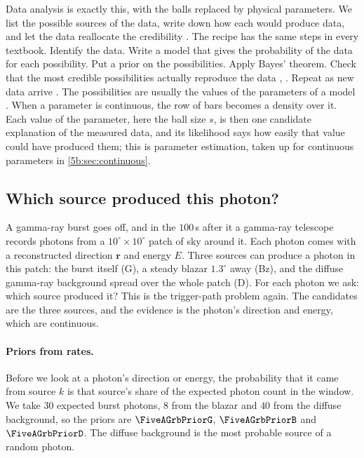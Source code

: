 Data analysis is exactly this, with the balls replaced by physical parameters. We
list the possible sources of the data, write down how each would produce data,
and let the data reallocate the credibility . The recipe
has the same steps in every textbook. Identify the data. Write a model that gives
the probability of the data for each possibility. Put a prior on the
possibilities. Apply Bayes' theorem. Check that the most credible possibilities
actually reproduce the data , . Repeat as
new data arrive . The possibilities are usually the
values of the parameters of a model . When a parameter is
continuous, the row of bars becomes a density over it. Each value of the parameter, here
the ball size $s$, is then one candidate explanation of the measured data, and
its likelihood says how easily that value could have produced them; this is
parameter estimation, taken up for continuous parameters in
\cref{5b:sec:continuous}.

\subsection{Which source produced this photon?}

A gamma-ray burst goes off, and in the $100\,$s after it a gamma-ray telescope
records photons from a $10^\circ\times10^\circ$ patch of sky around it. Each photon
comes with a reconstructed direction $\bm r$ and energy $E$. Three sources can produce
a photon in this patch: the burst itself (G), a steady blazar $1.3^\circ$ away (Bz),
and the diffuse gamma-ray background spread over the whole patch (D). For each
photon we ask: which source produced it? This is the trigger-path problem again.
The candidates are the three sources, and the evidence is the photon's direction
and energy, which are continuous.

\paragraph{Priors from rates.}
Before we look at a photon's direction or energy, the probability that it came from
source $k$ is that source's share of the expected photon count in the window. We
take $30$ expected burst photons, $8$ from the blazar and $40$ from the diffuse
background, so the priors are $\FiveAGrbPriorG$, $\FiveAGrbPriorB$ and
$\FiveAGrbPriorD$. The diffuse background is the most probable source of a random
photon.

